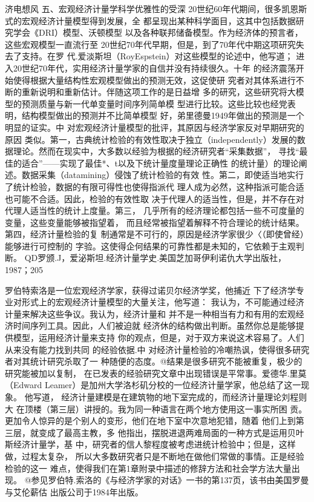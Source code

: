 济电想风
五、宏观经济计量学科学优雅性的受深
20世纪60年代期间，很多凯恩斯式的宏观经济计量模型得到发展，全
都呈现出某种科学面目，这其中包括数据研究学会《DRI）模型、沃顿模型
以及各种联邦储备模型。作为经济体的预言者，这些宏观模型一直流行至
20世纪70年代早期，但是，到了70年代中期这项研究失去了支持。在罗
代.爱淡斯坦（RoyEspstein）对这些模型的论述中，他写道；
进入20世纪70年代，实用经济计量学家的自信并没有持续很久。十年
的经济震荡开始使得根据大量结构性宏观模型做出的预测无效，这促使研
究者对其体系进行不断的重新说明和重新估计。伴随这项工作的是日益增
多的研究，这些研究将大模型的预测质量与新一代单变量时间序列简单模
型进行比较。这些比较也经党表明，结构模型做出的预测并不比简单模型
好，弟里德曼1949年做出的预测是一个明显的证实。中
对宏观经济计量模型的批评，其原因与经济学家反对早期研究的原因
类似。第一，古典统计检验的有效性取决于独立（independently）发展的数
据理论。然而在现实中，大多数以经验为根据的经济研究者“采集数据”，
寻找“最佳的适合”——实现了最佳*、t以及下统计量度量理论正确性
的统计量）的理论阐述。数据采集（datamining）侵蚀了统计检验的有效
性。第二，即使适当地实行了统计检验，数据的有限可得性也使得指派代
理人成为必然，这种指派可能合适也可能不合适。因此，检验的有效性取
决于代理人的适当性，但是，并不存在对代理人适当性的统计上度量。第三，
几乎所有的经济理论都包括一些不可度量的变量，这些变量能够被指望着，
而且经常被指望着解释不符合理论的统计结果。第四，经济计量检验的复
制通常是不可行的，原因是经济学家很少〈（即使曾经）能够进行可控制的
字验。这使得企何结果的可靠性都是未知的，它依赖于主观判断。
QD罗颁.J，爱泌斯坦.经济计量学史.美国芝加哥伊利诺仇大学出版社，1987；205

罗伯特索洛是一位宏观经济学家，获得过诺贝尔经济学奖，他捕近
下了经济学专业对形式上的宏观经济计量模型的大量关注，他写道：
我认为，不可能通过经济计量来解决这些争议。我认为，经济计量和
并不是一种相当有力和有用的宏观经济时间序列工具。因此，人们被迫就
经济休的结构做出判断。虽然你总是能够提供模型，运用经济计量来支持
你的观点，但是，对于双方来说这术容易了。人们从来没有能力找到共同
的经验依据.中
对经济计量检验的冷嘲热讽，使得很多研究者对其统计研究杀取了一
种随便的态度。@结果是很多研究不能被重复，极少的研究能被加以复制，
在已发表的经验研究文章中出现错误是平常事。爱德华.里莫（Edward
Leamer）是加州大学洛杉矶分校的一位经济计量学家，他总结了这一现象。
他写道，
经济计量建模是在建筑物的地下室完成的，而经济计量理论刘程则大
在顶楼（第三层）讲授的。我为同一种语言在两个地方使用这一事实所困
贡。更加令人惊异的是个别人的变形，他们在地下室中次意地犯错，随着
他们上到第三层，就变成了最高主教，多
他指出，摆脱进退两难局面的一种方式是运用贝叶斯经济计量学，基
中，研究者的信人黎程度被考虑进统计检验中；但是，这样做，过程太复杂，
所以大多数研究者只是不断地在做他们常做的事情。正是经验检验的这一
难点，使得我们在第1章附录中描述的修辞方法和社会学方法大量出现。
@参见罗伯特.索洛的《与经济学家的对话》一书的第137页，该书由美国罗曼与艾伦薪估
出版公司于1984年出版。


